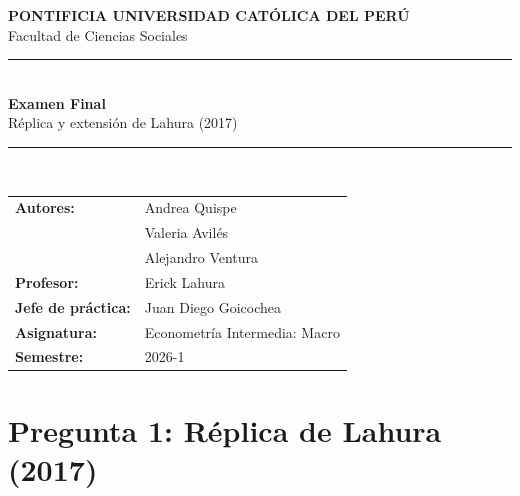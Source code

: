 \documentclass[12pt, letterpaper]{article}
\begin{document}
\begin{titlepage}
\thispagestyle{empty}
\begin{center}
\vspace*{0.8cm}
{\large\textbf{PONTIFICIA UNIVERSIDAD CATÓLICA DEL PERÚ}}\\[0.2cm]
{\normalsize Facultad de Ciencias Sociales}\\[1.8cm]
\noindent\rule{\linewidth}{1.2pt}\\[0.5cm]
{\LARGE\textbf{Examen Final}}\\[0.3cm]
{\large Réplica y extensión de Lahura (2017)}\\[0.5cm]
\noindent\rule{\linewidth}{1.2pt}\\[2.5cm]
\begin{tabular}{ll}
\textbf{Autores:}           & Andrea Quispe\\[0.15cm]
                            & Valeria Avilés\\[0.15cm]
                            & Alejandro Ventura\\[0.5cm]
\textbf{Profesor:}          & Erick Lahura\\[0.5cm]
\textbf{Jefe de práctica:}  & Juan Diego Goicochea\\[0.5cm]
\textbf{Asignatura:}        & Econometría Intermedia: Macro\\[0.5cm]
\textbf{Semestre:}          & 2026-1
\end{tabular}
\end{center}
\end{titlepage}

\setcounter{page}{1}
\pagestyle{plain}

\newpage
\tableofcontents

\newpage
\listoftables
\listoffigures

\newpage
{}
\setcounter{page}{1}
\pagestyle{fancy}

\section{Pregunta 1: Réplica de Lahura (2017)}
\end{document}
